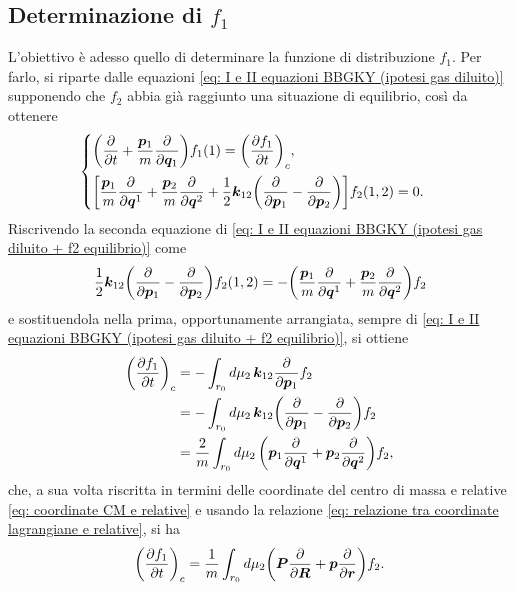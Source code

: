 \subsection{Determinazione di \texorpdfstring{$f_1$}{f1}}
L'obiettivo è adesso quello di determinare la funzione di distribuzione $f_1$. Per farlo, si riparte dalle equazioni \eqref{eq: I e II equazioni BBGKY (ipotesi gas diluito)} supponendo che $f_2$ abbia già raggiunto una situazione di equilibrio, così da ottenere
\begin{equation}
\label{eq: I e II equazioni BBGKY (ipotesi gas diluito + f2 equilibrio)}
    \begin{cases}
        \bigg(\dfrac{\partial}{\partial t} + \dfrac{\bm{p}_1}{m}\dfrac{\partial}{\partial \bm{q}_1}\bigg)f_1(1) = \bigg(\dfrac{\partial f_1}{\partial t}\bigg)_c, \\[2.5ex]
        \bigg[\dfrac{\bm{p}_1}{m}\dfrac{\partial}{\partial \bm{q}^1} + \dfrac{\bm{p}_2}{m}\dfrac{\partial}{\partial \bm{q}^2} + \dfrac{1}{2}\bm{k}_{12}\bigg(\dfrac{\partial}{\partial \bm{p}_1} - \dfrac{\partial}{\partial \bm{p}_2}\bigg)\bigg]f_2(1,2) = 0.
    \end{cases}
\end{equation}
Riscrivendo la seconda equazione di \eqref{eq: I e II equazioni BBGKY (ipotesi gas diluito + f2 equilibrio)} come
\begin{equation}
\label{eq: processo di interazione 1 e 2}
    \dfrac{1}{2}\bm{k}_{12}\bigg(\dfrac{\partial}{\partial \bm{p}_1} - \dfrac{\partial}{\partial \bm{p}_2}\bigg)f_2(1,2) = - \bigg(\frac{\bm{p}_1}{m}\dfrac{\partial}{\partial \bm{q}^1} + \frac{\bm{p}_2}{m}\dfrac{\partial}{\partial \bm{q}^2}\bigg) f_2
\end{equation}
e sostituendola nella prima, opportunamente arrangiata, sempre di \eqref{eq: I e II equazioni BBGKY (ipotesi gas diluito + f2 equilibrio)}, si ottiene
\begin{equation}
    \begin{split}
        \bigg(\frac{\partial f_1}{\partial t}\bigg)_c &= -\int_{r_0}d\mu_2\,\bm{k}_{12}\frac{\partial}{\partial \bm{p}_1}f_2 \\
        &= -\int_{r_0}d\mu_2\,\bm{k}_{12}\bigg(\frac{\partial}{\partial \bm{p}_1} - \frac{\partial}{\partial \bm{p}_2}\bigg)f_2 \\
        &= \frac{2}{m}\int_{r_0}d\mu_2\,\bigg(\bm{p}_1\frac{\partial}{\partial \bm{q}^1} + \bm{p}_2\frac{\partial}{\partial \bm{q}^2}\bigg)f_2, 
    \end{split}
\end{equation}
che, a sua volta riscritta in termini delle coordinate del centro di massa e relative \eqref{eq: coordinate CM e relative} e usando la relazione \eqref{eq: relazione tra coordinate lagrangiane e relative}, si ha
\begin{equation}
    \bigg(\frac{\partial f_1}{\partial t}\bigg)_c = \frac{1}{m}\int_{r_0}d\mu_2\bigg(\bm{P}\frac{\partial}{\partial \bm{R}} + \bm{p}\frac{\partial}{\partial \bm{r}}\bigg)f_2.
\end{equation}
